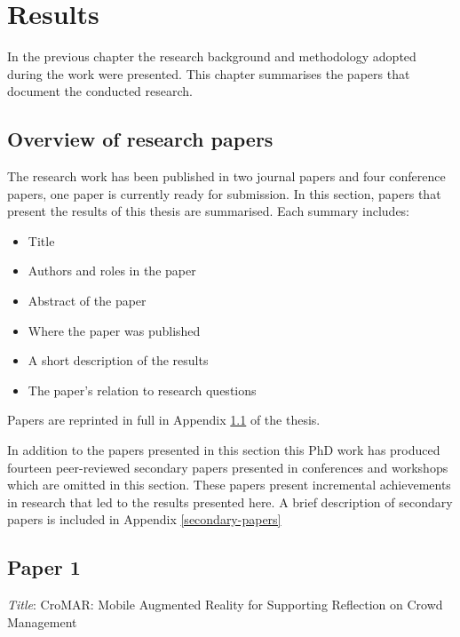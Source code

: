 \chapter{Results}\label{results}


In the previous chapter the research background and methodology adopted during the work were presented. This chapter summarises the papers that document the conducted research.

\section{Overview of research papers}\label{papers}

The research work has been published in two journal papers and four conference papers, one paper is currently ready for submission. In this section, papers that present the results of this thesis are summarised. Each summary includes: 
\begin{itemize}
	\itemsep1pt\parskip0pt 
	\item Title 
	\item Authors and roles in the paper 
	\item Abstract of the paper
	\item Where the paper was published 
	\item A short description of the results 
	\item The paper's relation to research questions 
\end{itemize}

Papers are reprinted in full in Appendix \ref{papers} of the thesis.

In addition to the papers presented in this section this PhD work has produced fourteen peer-reviewed secondary papers presented in conferences and workshops which are omitted in this section. These papers present incremental achievements in research that led to the results presented here. A brief description of secondary papers is included in Appendix \ref{secondary-papers}

\section[P1: CroMAR: Mobile Augmented Reality for Supporting Reflection on Crowd Management]{Paper 1} \label{paper-1}

\emph{Title}: CroMAR: Mobile Augmented Reality for Supporting Reflection on Crowd Management

